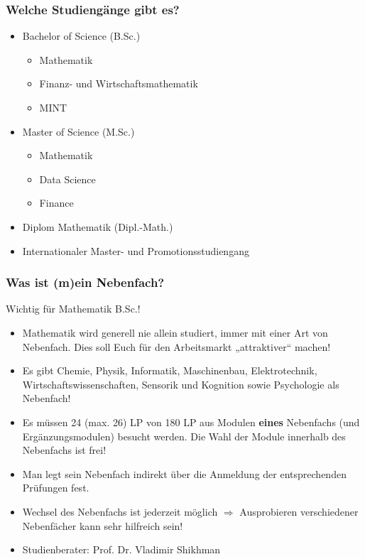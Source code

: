 \documentclass[10pt]{beamer}
\makeatletter
\newcommand{\highl}[1]{\color{tuccolor@ma}#1\color{black}}
\makeatother
\begin{document}
\begin{frame}
	\frametitle{Welche Studiengänge gibt es?}
	\begin{itemize}
		\item Bachelor of Science (B.Sc.)
			\begin{itemize}
				\item Mathematik
				\item Finanz- und Wirtschafts­mathematik
				\item MINT
			\end{itemize}
		\item Master of Science (M.Sc.)
			\begin{itemize}
				\item Mathematik
				\item Data Science
				\item Finance
			\end{itemize}
		\item Diplom Mathematik (Dipl.-Math.)
		\item Internationaler Master- und Promotions­studiengang
	\end{itemize}
\end{frame}

\begin{frame}
	\frametitle{Was ist (m)ein Nebenfach?}
	\highl{Wichtig für Mathematik B.Sc.!}
	\begin{itemize}
		\item Mathematik wird generell nie allein studiert, immer mit einer Art von Nebenfach. Dies soll Euch für den Arbeitsmarkt „attraktiver“ machen!
		\item Es gibt Chemie, Physik, Informatik, Maschinenbau, Elektrotechnik, Wirtschaftswissenschaften, Sensorik und Kognition sowie Psychologie als Nebenfach!
		\item Es müssen 24 (max. 26) LP von 180 LP aus Modulen \textbf{eines} Nebenfachs (und Ergänzungsmodulen) besucht werden. Die Wahl der Module innerhalb des Nebenfachs ist frei!
		\item Man legt sein Nebenfach indirekt über die Anmeldung der entsprechenden Prüfungen fest.
		\item Wechsel des Nebenfachs ist jederzeit möglich $\Rightarrow$ Ausprobieren verschiedener Nebenfächer kann sehr hilfreich sein!
		\item Studienberater: Prof. Dr. Vladimir Shikhman
	\end{itemize}
\end{frame}
\end{document}
